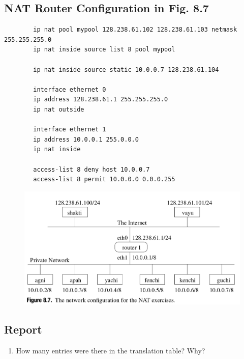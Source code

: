 \documentclass[10pt,a4paper]{article}
\numberwithin{equation}{section}
\numberwithin{figure}{section}
\numberwithin{table}{section}
\begin{document}
    \subsection*{NAT Router Configuration in Fig. 8.7}
    \begin{verbatim}
        ip nat pool mypool 128.238.61.102 128.238.61.103 netmask 255.255.255.0
        ip nat inside source list 8 pool mypool

        ip nat inside source static 10.0.0.7 128.238.61.104

        interface ethernet 0
        ip address 128.238.61.1 255.255.255.0
        ip nat outside

        interface ethernet 1
        ip address 10.0.0.1 255.0.0.0
        ip nat inside

        access-list 8 deny host 10.0.0.7
        access-list 8 permit 10.0.0.0 0.0.0.255
    \end{verbatim}
    \begin{figure}[H]
        \centering
        \includegraphics[width=\textwidth]{img/fig1.png}
    \end{figure}
    \subsection*{Report}
    \begin{enumerate}
        \item How many entries were there in the translation table?
        Why?
    \end{enumerate}
\end{document}
